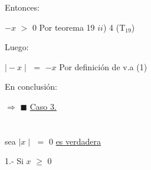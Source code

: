 \documentclass[12pt]{article}
\renewcommand{\qedsymbol}{$\blacksquare$}
\begin{document}
{\textcolor{palatinateblue}{Entonces:}} \vspace{0.5cm}

\hspace{5cm} $-x$ $>$ $0$ \hspace{1.9cm} {\textcolor{carrotorange}{Por teorema 19 $ii$) 4 (T$_{19}$)}} \vspace{0.5cm}

{\textcolor{palatinateblue}{Luego:}} \vspace{0.5cm}

\hspace{4.4cm} $\mid -x \mid$ $=$ $-x$ \hspace{0.8cm} {\textcolor{carrotorange}{Por definición de v.a (1)}} \vspace{0.5cm}

{\textcolor{palatinateblue}{En conclusión:}} \vspace{0.5cm}

\hspace{2.8cm} $\Longrightarrow$ \hspace{0.9cm} {\textcolor{vividviolet}{{}}}  \hspace{0.5cm} {\textcolor{carrotorange}{\qedsymbol}} \hspace{0.1cm} {\textcolor{palatinateblue}{\underline{Caso 3.}}} \vspace{1cm}


\section*{}  \vspace{.5cm}

{} \vspace{0.5cm}

{} \vspace{0.5cm}

{\textcolor{palatinateblue}{sea} $\mid x \mid $ $=$ $0$ } {\textcolor{verde_manzana}{{\underline{es verdadera}}}} \vspace{0.5cm}

\newpage

{\textcolor{yellow(munsell)}{1.-}} {\textcolor{palatinateblue}{Si}} $x$ $\geq$ $0$ \vspace{0.5cm}
\end{document}
